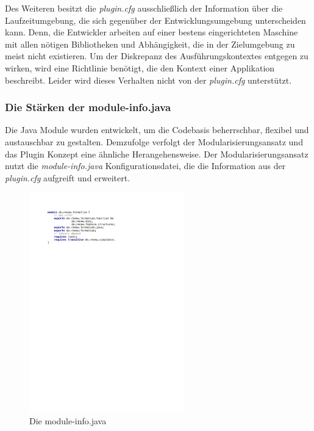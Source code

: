 			Des Weiteren besitzt die \textit{plugin.cfg} ausschließlich der Information über die Laufzeitumgebung, die sich gegenüber der Entwicklungsumgebung unterscheiden kann. Denn, die Entwickler arbeiten auf einer bestens eingerichteten Maschine mit allen nötigen Bibliotheken und Abhängigkeit, die in der Zielumgebung zu meist nicht existieren. Um der Diskrepanz des Ausführungskontextes entgegen zu wirken, wird eine Richtlinie benötigt, die den Kontext einer Applikation beschreibt. Leider wird dieses Verhalten nicht von der \textit{plugin.cfg} unterstützt. 

		\subsubsection{Die Stärken der module-info.java} \label{sub:module-info.java}
			Die Java Module wurden entwickelt, um die Codebasis beherrschbar, flexibel und austauschbar zu gestalten. Demzufolge verfolgt der Modularisierungsansatz und das Plugin Konzept eine ähnliche Herangehensweise. Der Modularisierungsansatz nutzt die \textit{module-info.java} Konfigurationsdatei, die die Information aus der \textit{plugin.cfg} aufgreift und erweitert. \newline
			\begin{figure}[h!]
			  \centering
			  \includegraphics[width=0.6\textwidth]{material/images/m-info.pdf}
			  \caption{Die module-info.java}
			  \label{fig:module_info}
			\end{figure}

